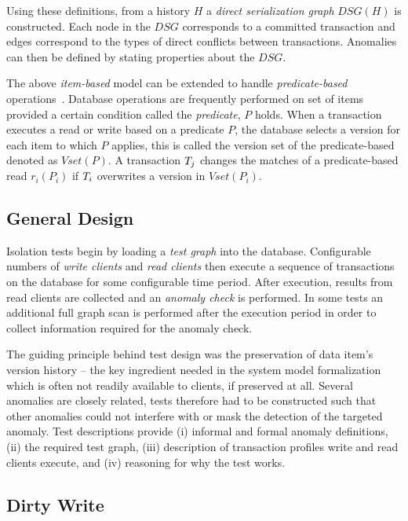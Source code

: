 Using these definitions, from a history $H$ a \emph{direct serialization graph} $\textit{DSG}(H)$ is constructed.
Each node in the $\textit{DSG}$ corresponds to a committed transaction and edges correspond to the types of direct conflicts between transactions.
Anomalies can then be defined by stating properties about the $\textit{DSG}$.

The above \emph{item-based} model can be extended to handle \emph{predicate-based} operations~\cite{adya1999weak}.
Database operations are frequently performed on set of items provided a certain condition called the \emph{predicate}, $P$ holds.
When a transaction executes a read or write based on a predicate $P$, the database selects a version for each
item to which $P$ applies, this is called the version set of the predicate-based denoted as $\textit{Vset}(P)$.
A transaction $T_j$ changes the matches of a predicate-based read $r_i(P_i)$ if $T_i$ overwrites a version in $\textit{Vset}(P_i)$.

\subsection{General Design}
\label{sec:design-cons}

Isolation tests begin by loading a \emph{test graph} into the database.
Configurable numbers of \emph{write clients} and \emph{read clients} then execute a sequence of transactions on the database for some configurable time period.
After execution, results from read clients are collected and an \emph{anomaly check} is performed.
In some tests an additional full graph scan is performed after the execution period in order to collect information required for the anomaly check.

The guiding principle behind test design was the preservation of data item's version history -- the key ingredient needed in the system model formalization which is often not readily available to clients, if preserved at all.
Several anomalies are closely related, tests therefore had to be constructed such that other anomalies could not interfere with or mask the detection of the targeted anomaly.
Test descriptions provide
(i) informal and formal anomaly definitions,
(ii) the required test graph,
(iii) description of transaction profiles write and read clients execute, and
(iv) reasoning for why the test works.

\subsection{Dirty Write}
\label{sec:dirty-write}

